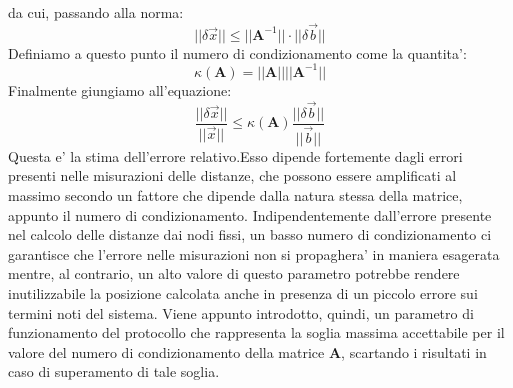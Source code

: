 \documentclass[Lau,binding=0.6cm]{sapthesis}
\begin{document}
\newline
da cui, passando alla norma: \newline
\begin{equation}
||\delta\overrightarrow{x}|| \leq ||\textbf{A}^{-1}|| \cdot ||\delta\overrightarrow{b}||
\end{equation}
Definiamo a questo punto il numero di condizionamento come la quantita': \newline
\begin{equation}
\kappa (\textbf{A}) = ||\textbf{A}|| ||\textbf{A}^{-1}|| 
\end{equation}
\newline
Finalmente giungiamo all'equazione: \newline
\begin{equation}
\frac{||\delta\overrightarrow{x}||}{||\overrightarrow{x}||} \leq  \kappa (\textbf{A}) \frac{||\delta\overrightarrow{b}||}{||\overrightarrow{b}||}
\end{equation}
Questa e' la stima dell'errore relativo.Esso dipende fortemente dagli errori presenti nelle misurazioni delle distanze, che possono essere amplificati al massimo secondo un fattore che dipende dalla natura stessa della matrice, appunto il numero di condizionamento. Indipendentemente dall'errore presente nel calcolo delle distanze dai nodi fissi, un basso numero di condizionamento ci garantisce che l'errore nelle misurazioni non si propaghera' in maniera esagerata mentre, al contrario, un alto valore di questo parametro potrebbe rendere inutilizzabile la posizione calcolata anche in presenza di un piccolo errore sui termini noti del sistema.\newline
Viene appunto introdotto, quindi, un parametro di funzionamento del protocollo che rappresenta la soglia massima accettabile per il valore del numero di condizionamento della matrice \textbf{A}, scartando i risultati in caso di superamento di tale soglia.
\end{document}
